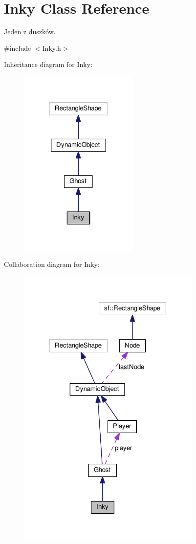 \hypertarget{classInky}{}\section{Inky Class Reference}
\label{classInky}


Jeden z duszków.  




{\ttfamily \#include $<$Inky.\+h$>$}



Inheritance diagram for Inky\+:\nopagebreak
\begin{figure}[H]
\begin{center}
\leavevmode
\includegraphics[width=169pt]{classInky__inherit__graph}
\end{center}
\end{figure}


Collaboration diagram for Inky\+:\nopagebreak
\begin{figure}[H]
\begin{center}
\leavevmode
\includegraphics[width=259pt]{classInky__coll__graph}
\end{center}
\end{figure}
